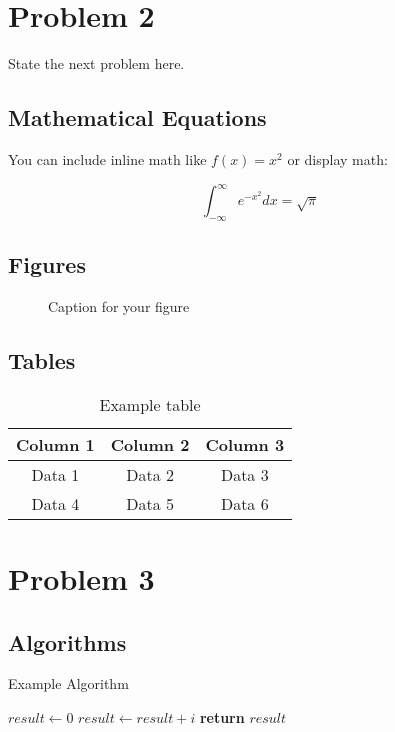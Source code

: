 \documentclass[11pt, a4paper, oneside]{article}
\begin{document}
\section{Problem 2}

State the next problem here.

\subsection{Mathematical Equations}

You can include inline math like $f(x) = x^2$ or display math:

\[
\int_{-\infty}^{\infty} e^{-x^2} dx = \sqrt{\pi}
\]

\subsection{Figures}

\begin{figure}[H]
  \centering
  \caption{Caption for your figure}
  \label{fig:example}
\end{figure}

\subsection{Tables}

\begin{table}[H]
  \centering
  \begin{tabular}{|c|c|c|}
    \hline
    \textbf{Column 1} & \textbf{Column 2} & \textbf{Column 3} \\ \hline
    Data 1 & Data 2 & Data 3 \\ \hline
    Data 4 & Data 5 & Data 6 \\ \hline
  \end{tabular}
  \caption{Example table}
  \label{tab:example}
\end{table}

\section{Problem 3}

\subsection{Algorithms}

\begin{algorithm}[H]
\caption{Example Algorithm}
\begin{algorithmic}[1]
    \State $result \gets 0$
        \State $result \gets result + i$
    \EndFor
    \State \textbf{return} $result$
\EndProcedure
\end{algorithmic}
\end{algorithm}
\end{document}

